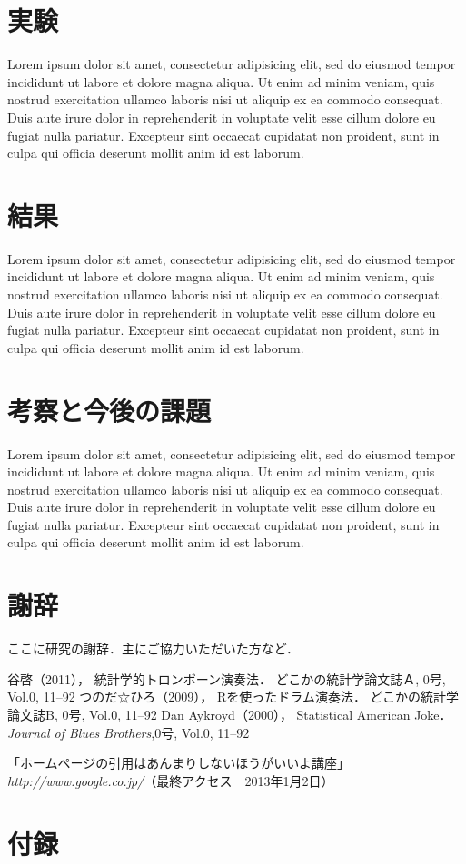 \documentclass[a4j,10.5pt]{jarticle}
\begin{document}
\section{実験}
Lorem ipsum dolor sit amet, consectetur adipisicing elit, sed do eiusmod tempor incididunt ut labore et dolore magna aliqua. Ut enim ad minim veniam, quis nostrud exercitation ullamco laboris nisi ut aliquip ex ea commodo consequat. Duis aute irure dolor in reprehenderit in voluptate velit esse cillum dolore eu fugiat nulla pariatur. Excepteur sint occaecat cupidatat non proident, sunt in culpa qui officia deserunt mollit anim id est laborum.

\section{結果}
Lorem ipsum dolor sit amet, consectetur adipisicing elit, sed do eiusmod tempor incididunt ut labore et dolore magna aliqua. Ut enim ad minim veniam, quis nostrud exercitation ullamco laboris nisi ut aliquip ex ea commodo consequat. Duis aute irure dolor in reprehenderit in voluptate velit esse cillum dolore eu fugiat nulla pariatur. Excepteur sint occaecat cupidatat non proident, sunt in culpa qui officia deserunt mollit anim id est laborum.

\section{考察と今後の課題}
Lorem ipsum dolor sit amet, consectetur adipisicing elit, sed do eiusmod tempor incididunt ut labore et dolore magna aliqua. Ut enim ad minim veniam, quis nostrud exercitation ullamco laboris nisi ut aliquip ex ea commodo consequat. Duis aute irure dolor in reprehenderit in voluptate velit esse cillum dolore eu fugiat nulla pariatur. Excepteur sint occaecat cupidatat non proident, sunt in culpa qui officia deserunt mollit anim id est laborum.

\section*{謝辞}
ここに研究の謝辞．主にご協力いただいた方など．

\begin{thebibliography}{3}
谷啓（2011），
統計学的トロンボーン演奏法．
どこかの統計学論文誌Ａ, 0号, Vol.0, 11--92 
つのだ☆ひろ（2009），
Rを使ったドラム演奏法．
どこかの統計学論文誌B, 0号, Vol.0, 11--92 
Dan Aykroyd（2000），
Statistical American Joke．
{\it Journal of Blues Brothers},0号, Vol.0, 11--92 

「ホームページの引用はあんまりしないほうがいいよ講座」{\it http://www.google.co.jp/}（最終アクセス　2013年1月2日）
\end{thebibliography}

\section*{付録}
\end{document}
